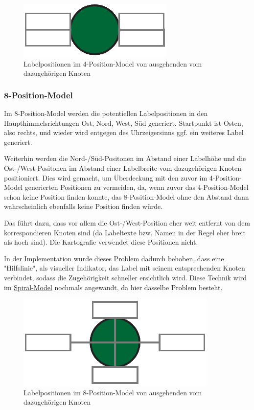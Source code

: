 \begin{figure}[H]
    \centering
    \includegraphics[scale=0.55]{../img/4pos}
    \caption{Labelpositionen im 4-Position-Model von ausgehenden vom dazugehörigen Knoten}
    \label{fig:4pos}
\end{figure}

\subsubsection{8-Position-Model}
\label{subsubsec:8pos}
Im 8-Position-Model werden die potentiellen Labelpositionen in den Haupthimmelsrichtungen Ost, Nord, West, Süd generiert.
Startpunkt ist Osten, also rechts, und wieder wird entgegen des Uhrzeigersinns ggf. ein weiteres Label generiert.

Weiterhin werden die Nord-/Süd-Positonen im Abstand einer Labelhöhe und die Ost-/West-Positonen im Abstand einer Labelbreite vom dazugehörigen Knoten positioniert.
Dies wird gemacht, um Überdeckung mit den zuvor im 4-Position-Model generierten Positionen zu vermeiden, da, wenn zuvor das 4-Position-Model schon keine Position finden konnte,
das 8-Position-Model ohne den Abstand dann wahrscheinlich ebenfalls keine Position finden würde.

Das führt dazu, dass vor allem die Ost-/West-Position eher weit entfernt von dem korrespondieren Knoten sind (da Labeltexte bzw. Namen in der Regel eher breit als hoch sind).
Die Kartografie verwendet diese Positionen nicht.\cite{cartography}

In der Implementation wurde dieses Problem dadurch behoben, dass eine "Hilfslinie", als visueller Indikator, das Label mit seinem entsprechenden Knoten verbindet,
sodass die Zugehörigkeit schneller ersichtlich wird.
Diese Technik wird im \hyperref[subsubsec:spiral]{Spiral-Model} nochmals angewandt, da hier dasselbe Problem besteht.

\begin{figure}[H]
    \centering
    \includegraphics[scale=0.55]{../img/8pos}
    \caption{Labelpositionen im 8-Position-Model von ausgehenden vom dazugehörigen Knoten}
    \label{fig:8pos}
\end{figure}

